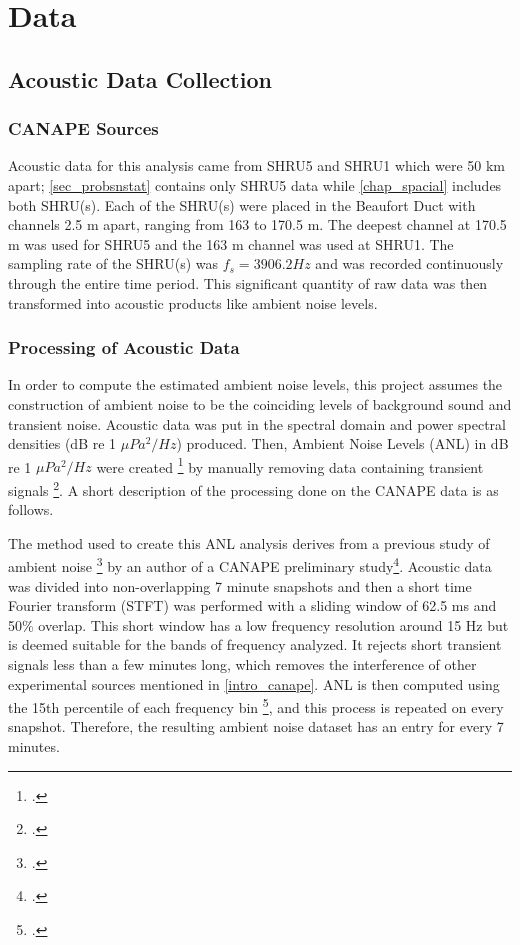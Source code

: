 \section{Data}

\subsection{Acoustic Data Collection} \label{intro_data_col}

\subsubsection{CANAPE Sources}
Acoustic data for this analysis came from SHRU5 and SHRU1 which were 50 km apart; \autoref{sec_probsnstat} contains only SHRU5 data while \autoref{chap_spacial} includes both SHRU(s). Each of the SHRU(s) were placed in the Beaufort Duct with channels 2.5 m apart, ranging from 163 to 170.5 m. The deepest channel at 170.5 m  was used for SHRU5 and the 163 m channel was used at SHRU1. The sampling rate of the SHRU(s) was $f_{s}=3906.2 Hz$ and was recorded continuously through the entire time period. This significant quantity of raw data was then transformed into acoustic products like ambient noise levels. 


\subsubsection{Processing of Acoustic Data}
In order to compute the estimated ambient noise levels, this project assumes the construction of ambient noise to be the coinciding levels of background sound and transient noise. Acoustic data was put in the spectral domain and power spectral densities (dB re 1 $\mu Pa^{2}/Hz$) produced. Then, Ambient Noise Levels (ANL) in dB re 1 $\mu Pa^{2}/Hz$ were created \footcite[]{carey2011ocean} by manually removing data containing transient signals \footcite[]{roth2012underwater}. A short description of the processing done on the CANAPE data is as follows.

The method used to create this ANL analysis derives from a previous study of ambient noise \footcite[]{bazile2013under} by an author of a CANAPE preliminary study\footcite[]{Bonnel2021}. Acoustic data was divided into non-overlapping 7 minute snapshots and then a short time Fourier transform (STFT) was performed with a sliding window of 62.5 ms and 50\% overlap. This short window has a low frequency resolution around 15 Hz but is deemed suitable for the bands of frequency analyzed. It rejects short transient signals less than a few minutes long, which removes the interference of other experimental sources mentioned in \autoref{intro_canape}. ANL is then computed using the 15th percentile of each frequency bin \footcite[]{huillery2008description}, and this process is repeated on every snapshot. Therefore, the resulting ambient noise dataset has an entry for every 7 minutes.

